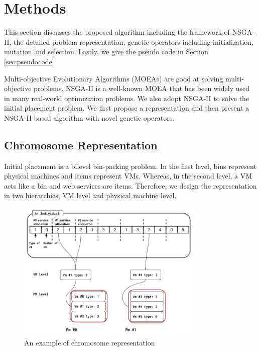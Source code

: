 \section{Methods}
\label{sec:method}
This section discusses the proposed algorithm including the framework of NSGA-II, the 
detailed problem representation, genetic operators including initialization, mutation and selection.
Lastly, we give the pseudo code in Section \ref{sec:pseudocode}.

Multi-objective Evolutionary Algorithms (MOEAs) are good at solving 
multi-objective problems. 
NSGA-II \cite{nsgaii} is a well-known MOEA that has been widely used in many real-world optimization problems. 
We also adopt NSGA-II to solve the initial placement problem. 
We first propose a representation and then present a NSGA-II based algorithm with novel genetic operators.

\subsection{Chromosome Representation}
\label{sec:representation}
Initial placement is a bilevel bin-packing problem. In the first level, 
bins represent physical machines and items represent VMs. Whereas, in the second level, a VM acts like a bin and web services are items. 
Therefore, we design the representation in two hierarchies, VM level and physical machine level. 

\begin{figure}
\centering
  \includegraphics[width=0.8\textwidth]{pics/preliminary/cec.png}
  \caption{An example of chromosome representation}
  \label{fig:rep}
\end{figure}

